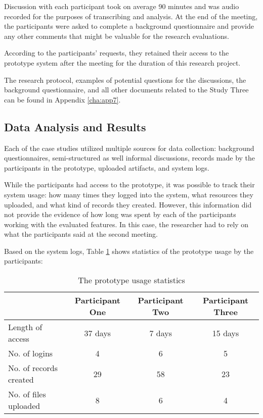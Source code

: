 Discussion with each participant took on average 90 minutes and was audio
recorded for the purposes of transcribing and analysis. At the end of the
meeting, the participants were asked to complete a background questionnaire and
provide any other comments that might be valuable for the research evaluations.

According to the participants' requests, they retained their access to the
prototype system after the meeting for the duration of this research project.

The research protocol, examples of potential questions for the discussions, the
background questionnaire, and all other documents related to the Study Three can
be found in Appendix \ref{cha:app7}.

\subsection{Data Analysis and Results}

Each of the case studies utilized multiple sources for data collection:
background questionnaires, semi-structured as well informal discussions, records
made by the participants in the prototype, uploaded artifacts, and system logs.

While the participants had access to the prototype, it was possible to track
their system usage: how many times they logged into the system, what resources
they uploaded, and what kind of records they created. However, this information
did not provide the evidence of how long was spent by each of the participants
working with the evaluated features. In this case, the researcher had to rely on
what the participants said at the second meeting.

Based on the system logs, Table \ref{tab:study3stats} shows statistics of the
prototype usage by the participants:

\begin{table}[htb] \small
\setlength{\abovecaptionskip}{0pt}
\caption{The prototype usage statistics}
\begin{center}
	\begin{tabular} {| p{3.5cm} | c | c | c |}
	 \hline
	 \multicolumn{1}{|c|}{} &
     \multicolumn{1}{c|}{\textbf{Participant One}} & 
     \multicolumn{1}{c|}{\textbf{Participant Two}} & 
     \multicolumn{1}{c|}{\textbf{Participant Three}} \\ \hline
	    Length of access\footnotemark[1] & 37 days & 7 days & 15 days \\ \hline 
	    No. of logins & 4 & 6 & 5 \\ \hline 
	    No. of records created & 29 & 58 & 23 \\ \hline
	    No. of files uploaded & 8 & 6 & 4 \\ \hline
	\end{tabular}
\end{center}
\label{tab:study3stats}
\end{table}

